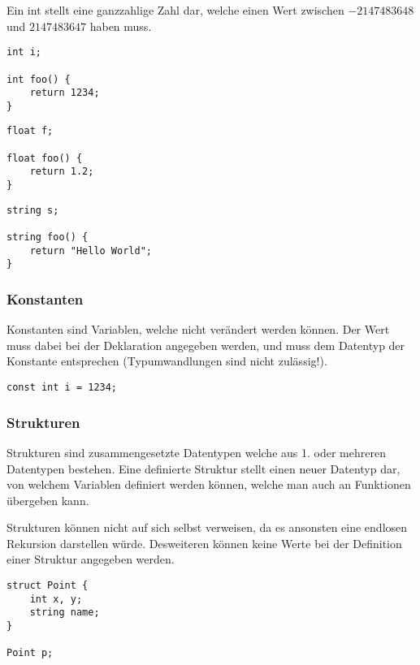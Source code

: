 
Ein int stellt eine ganzzahlige Zahl dar, welche einen Wert zwischen $-2147483648$ und $2147483647$ haben muss.

\begin{lstlisting}[language=CMM]
int i;

int foo() {
	return 1234;
}
\end{lstlisting}


\begin{lstlisting}[language=CMM]
float f;

float foo() {
	return 1.2;
}
\end{lstlisting}


\begin{lstlisting}[language=CMM]
string s;

string foo() {
	return "Hello World";
}
\end{lstlisting}

\subsubsection{Konstanten}

Konstanten sind Variablen, welche nicht ver\"andert werden k\"onnen. Der Wert muss dabei bei der Deklaration angegeben werden, und muss dem Datentyp der Konstante entsprechen (Typumwandlungen sind nicht zul\"assig!).

\begin{lstlisting}[language=CMM]
const int i = 1234;
\end{lstlisting}

\subsubsection{Strukturen}

Strukturen sind zusammengesetzte Datentypen welche aus 1. oder mehreren Datentypen bestehen. Eine definierte Struktur stellt einen neuer Datentyp dar, von welchem Variablen definiert werden k\"onnen, welche man auch an Funktionen \"ubergeben kann.

Strukturen k\"onnen nicht auf sich selbst verweisen, da es ansonsten eine endlosen Rekursion darstellen w\"urde. Desweiteren k\"onnen keine Werte bei der Definition einer Struktur angegeben werden.

\begin{lstlisting}[language=CMM]
struct Point {
    int x, y;
    string name;
}

Point p;
\end{lstlisting}

